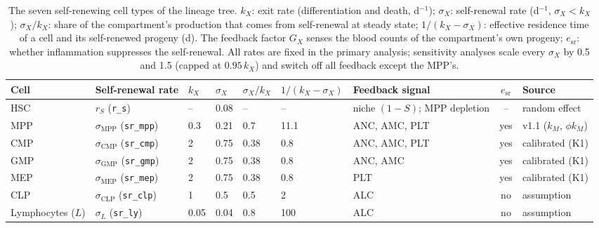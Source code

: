 \begin{table}[!htbp]
\centering
\footnotesize
\setlength{\tabcolsep}{3.5pt}
\caption{The seven self-renewing cell types of the lineage tree. $k_X$: exit rate (differentiation and death, d$^{-1}$); $\sigma_X$: self-renewal rate (d$^{-1}$, $\sigma_X<k_X$); $\sigma_X/k_X$: share of the compartment's production that comes from self-renewal at steady state; $1/(k_X-\sigma_X)$: effective residence time of a cell and its self-renewed progeny (d). The feedback factor $G_X$ senses the blood counts of the compartment's own progeny; $e_{\mathrm{sr}}$: whether inflammation suppresses the self-renewal. All rates are fixed in the primary analysis; sensitivity analyses scale every $\sigma_X$ by 0.5 and 1.5 (capped at $0.95\,k_X$) and switch off all feedback except the MPP's.}
\label{tab:selfrenewal}
\begin{tabular}{llllll>{\raggedright\arraybackslash}p{2.1cm}c>{\raggedright\arraybackslash}p{2.3cm}}
\toprule
Cell & Self-renewal rate & $k_X$ & $\sigma_X$ & $\sigma_X/k_X$ & $1/(k_X-\sigma_X)$ & Feedback signal & $e_{\mathrm{sr}}$ & Source \\
\midrule
HSC & $r_S$ (\texttt{r\_s}) & -- & 0.08 & -- & -- & niche $(1-S)$; MPP depletion & -- & random effect \\
MPP & $\sigma_{\mathrm{MPP}}$ (\texttt{sr\_mpp}) & 0.3 & 0.21 & 0.7 & 11.1 & ANC, AMC, PLT & yes & v1.1 ($k_M$, $\phi k_M$) \\
CMP & $\sigma_{\mathrm{CMP}}$ (\texttt{sr\_cmp}) & 2 & 0.75 & 0.38 & 0.8 & ANC, AMC, PLT & yes & calibrated (K1) \\
GMP & $\sigma_{\mathrm{GMP}}$ (\texttt{sr\_gmp}) & 2 & 0.75 & 0.38 & 0.8 & ANC, AMC & yes & calibrated (K1) \\
MEP & $\sigma_{\mathrm{MEP}}$ (\texttt{sr\_mep}) & 2 & 0.75 & 0.38 & 0.8 & PLT & yes & calibrated (K1) \\
CLP & $\sigma_{\mathrm{CLP}}$ (\texttt{sr\_clp}) & 1 & 0.5 & 0.5 & 2 & ALC & no & assumption \\
Lymphocytes ($L$) & $\sigma_{L}$ (\texttt{sr\_ly}) & 0.05 & 0.04 & 0.8 & 100 & ALC & no & assumption \\
\bottomrule
\end{tabular}
\end{table}
